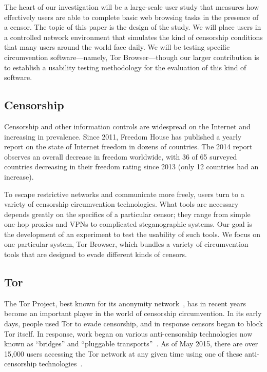 \documentclass[letterpaper,twocolumn,11pt]{article}
\begin{document}
The heart of our investigation will be a large-scale user study
that measures how effectively users are able to complete
basic web browsing tasks in the presence of a censor.
The topic of this paper is the design of the study.
We will place users in a controlled network environment
that simulates the kind of censorship conditions that many
users around the world face daily.
We will be testing specific circumvention software---namely,
Tor Browser---though our larger contribution is to establish
a usability testing methodology for the evaluation
of this kind of software.

\subsection{Censorship} %

\indent \indent Censorship and other information controls
are widespread on the Internet and increasing in prevalence.
Since 2011, Freedom House has published a yearly report
on the state of Internet freedom in dozens of countries.
The 2014 report~\cite{freedom-on-the-net-2014} observes
an overall decrease in freedom worldwide,
with 36 of 65 surveyed countries decreasing in their freedom rating
since 2013 (only 12 countries had an increase).

To escape restrictive networks and communicate more freely,
users turn to a variety of censorship circumvention technologies.
What tools are necessary depends greatly on the specifics of
a particular censor;
they range from simple one-hop proxies and VPNs
to complicated steganographic systems.
Our goal is the development of an experiment
to test the usability of such tools.
We focus on one particular system,
Tor Browser, which bundles a variety of circumvention
tools that are designed to evade different kinds of censors.

\subsection{Tor} 

\indent \indent The Tor Project, best known for its anonymity network~\cite{tor-design},
has in recent years become an important player in the world of
censorship circumvention.
In its early days, people used Tor to evade censorship,
and in response censors began to block Tor itself.
In response, work began on various anti-censorship technologies
now known as ``bridges'' and ``pluggable transports''~\cite{pluggable-transports}.
As of May 2015, there are over 15,000 users accessing the Tor network
at any given time using one of these
anti-censorship technologies~\cite{userstats-bridge-country}.
\end{document}
